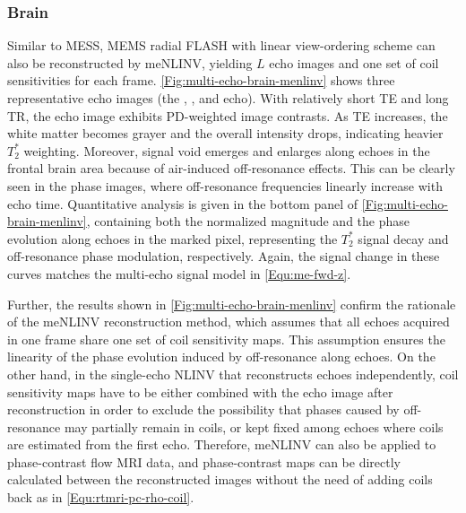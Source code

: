 \subsubsection*{Brain}
Similar to MESS, MEMS radial FLASH with linear view-ordering scheme can also be reconstructed by meNLINV, yielding $L$ echo images and one set of coil sensitivities for each frame. \cref{Fig:multi-echo-brain-menlinv} shows three representative echo images (the , , and  echo). With relatively short TE and long TR, the  echo image exhibits PD-weighted image contrasts. As TE increases, the white matter becomes grayer and the overall intensity drops, indicating heavier $T_2^*$ weighting. Moreover, signal void emerges and enlarges along echoes in the frontal brain area because of air-induced off-resonance effects. This can be clearly seen in the phase images, where off-resonance frequencies linearly increase with echo time. Quantitative analysis is given in the bottom panel of \cref{Fig:multi-echo-brain-menlinv}, containing both the normalized magnitude and the phase evolution along echoes in the marked pixel, representing the $T_2^*$ signal decay and off-resonance phase modulation, respectively. Again, the signal change in these curves matches the multi-echo signal model in \cref{Equ:me-fwd-z}. 

Further, the results shown in \cref{Fig:multi-echo-brain-menlinv} confirm the rationale of the meNLINV reconstruction method, which assumes that all echoes acquired in one frame share one set of coil sensitivity maps. This assumption ensures the linearity of the phase evolution induced by off-resonance along echoes. On the other hand, in the single-echo NLINV that reconstructs echoes independently, coil sensitivity maps have to be either combined with the echo image after reconstruction in order to exclude the possibility that phases caused by off-resonance may partially remain in coils, or kept fixed among echoes where coils are estimated from the first echo. Therefore, meNLINV can also be applied to phase-contrast flow MRI data, and phase-contrast maps can be directly calculated between the reconstructed images without the need of adding coils back as in \cref{Equ:rtmri-pc-rho-coil}. 


